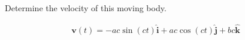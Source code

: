 Determine the velocity of this moving body.

\begin{solution}
\begin{align*}
    \boldsymbol{v}(t) = -ac\sin(ct) \hat{\boldsymbol{i}} + ac\cos(ct) \hat{\boldsymbol{j}} + bc \hat{\boldsymbol{k}}
\end{align*}
\end{solution}